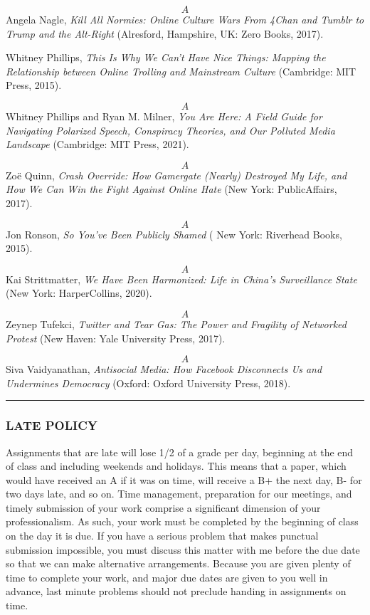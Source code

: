 \documentclass[]{tufte-handout}
\begin{document}
\[A\] Angela Nagle, \emph{Kill All Normies: Online Culture Wars From
4Chan and Tumblr to Trump and the Alt-Right} (Alresford, Hampshire, UK:
Zero Books, 2017).

Whitney Phillips, \emph{This Is Why We Can't Have Nice Things: Mapping
the Relationship between Online Trolling and Mainstream Culture}
(Cambridge: MIT Press, 2015).

\[A\] Whitney Phillips and Ryan M. Milner, \emph{You Are Here: A Field
Guide for Navigating Polarized Speech, Conspiracy Theories, and Our
Polluted Media Landscape} (Cambridge: MIT Press, 2021).

\[A\] Zoë Quinn, \emph{Crash Override: How Gamergate (Nearly) Destroyed
My Life, and How We Can Win the Fight Against Online Hate} (New York:
PublicAffairs, 2017).

\[A\] Jon Ronson, \emph{So You've Been Publicly Shamed} ( New York:
Riverhead Books, 2015).

\[A\] Kai Strittmatter, \emph{We Have Been Harmonized: Life in China's
Surveillance State} (New York: HarperCollins, 2020).

\[A\] Zeynep Tufekci, \emph{Twitter and Tear Gas: The Power and
Fragility of Networked Protest} (New Haven: Yale University Press,
2017).

\[A\] Siva Vaidyanathan, \emph{Antisocial Media: How Facebook
Disconnects Us and Undermines Democracy} (Oxford: Oxford University
Press, 2018).

\begin{center}\rule{0.5\linewidth}{0.5pt}\end{center}

\hypertarget{late-policy}{%
\subsubsection{LATE POLICY}\label{late-policy}}

Assignments that are late will lose 1/2 of a grade per day, beginning at
the end of class and including weekends and holidays. This means that a
paper, which would have received an A if it was on time, will receive a
B+ the next day, B- for two days late, and so on. Time management,
preparation for our meetings, and timely submission of your work
comprise a significant dimension of your professionalism. As such, your
work must be completed by the beginning of class on the day it is due.
If you have a serious problem that makes punctual submission impossible,
you must discuss this matter with me before the due date so that we can
make alternative arrangements. Because you are given plenty of time to
complete your work, and major due dates are given to you well in
advance, last minute problems should not preclude handing in assignments
on time.
\end{document}
